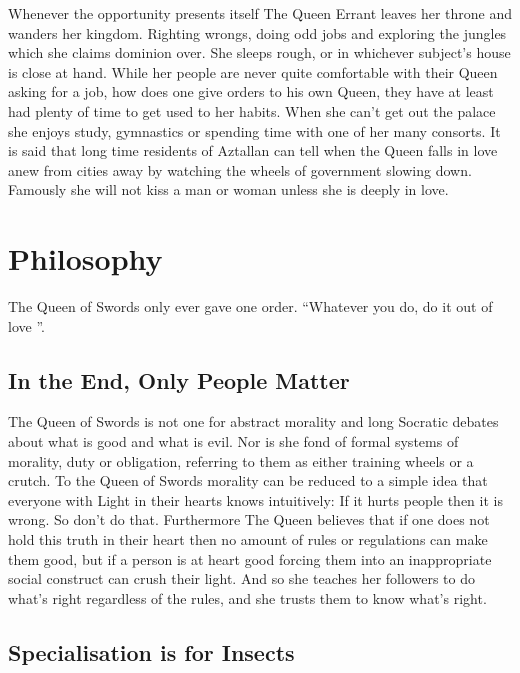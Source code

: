 Whenever the opportunity presents itself The Queen Errant leaves her throne and wanders her kingdom. Righting wrongs, doing odd jobs and exploring the jungles which she claims dominion over. She sleeps rough, or in whichever subject's house is close at hand. While her people are never quite comfortable with their Queen asking for a job, how does one give orders to his own Queen, they have at least had plenty of time to get used to her habits. When she can't get out the palace she enjoys study, gymnastics or spending time with one of her many consorts. It is said that long time residents of Aztallan can tell when the Queen falls in love anew from cities away by watching the wheels of government slowing down. Famously she will not kiss a man or woman unless she is deeply in love. 

\section*{Philosophy}

The Queen of Swords only ever gave one order. \textquotedblleft Whatever you do, do it out of love \textquotedblright. 

\subsection*{In the End, Only People Matter}

The Queen of Swords is not one for abstract morality and long Socratic debates about what is good and what is evil. Nor is she fond of formal systems of morality, duty or obligation, referring to them as either training wheels or a crutch. To the Queen of Swords morality can be reduced to a simple idea that everyone with Light in their hearts knows intuitively: If it hurts people then it is wrong. So don't do that. Furthermore The Queen believes that if one does not hold this truth in their heart then no amount of rules or regulations can make them good, but if a person is at heart good forcing them into an inappropriate social construct can crush their light. And so she teaches her followers to do what's right regardless of the rules, and she trusts them to know what's right. 

\subsection*{Specialisation is for Insects}

